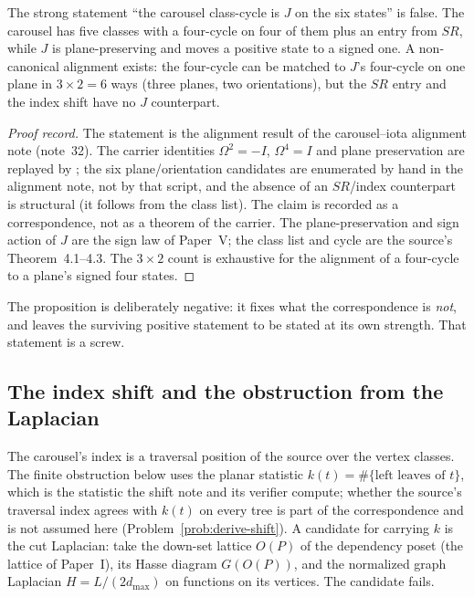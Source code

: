 \begin{proposition}\label{prop:screened-alignment}
The strong statement ``the carousel class-cycle is $J$ on the six states'' is false.
The carousel has five classes with a four-cycle on four of them plus an entry from
$SR$, while $J$ is plane-preserving and moves a positive state to a signed one.  A
non-canonical alignment exists: the four-cycle can be matched to $J$'s four-cycle on
one plane in $3\times 2=6$ ways (three planes, two orientations), but the $SR$ entry
and the index shift have no $J$ counterpart.
\end{proposition}

\begin{proof}[Proof record]
The statement is the alignment result of the carousel--iota alignment
note (note~32).  The carrier identities
$\Omega^{2}=-I$, $\Omega^{4}=I$ and plane preservation are replayed by
; the six plane/orientation candidates are
enumerated by hand in the alignment note, not by that script, and the absence of an
$SR$/index counterpart is structural (it follows from the class list).  The claim is
recorded as a correspondence, not as a theorem of the carrier.  The
plane-preservation and sign action of $J$ are the sign law of Paper~V; the class list
and cycle are the source's Theorem~4.1--4.3.  The $3\times2$ count is exhaustive for
the alignment of a four-cycle to a plane's signed four states.
\end{proof}

The proposition is deliberately negative: it fixes what the correspondence is
\emph{not}, and leaves the surviving positive statement to be stated at its own
strength.  That statement is a screw.

\subsection{The index shift and the obstruction from the Laplacian}

The carousel's index is a traversal position of the source over the vertex classes.
The finite obstruction below uses the planar statistic
$k(t)=\#\{\text{left leaves of }t\}$, which is the statistic the shift note and its
verifier compute; whether the source's traversal index agrees with $k(t)$ on every
tree is part of the correspondence and is not assumed here
(Problem~\ref{prob:derive-shift}).  A candidate for carrying $k$ is the cut Laplacian:
take the down-set lattice $O(P)$ of the dependency poset (the lattice of Paper~I),
its Hasse diagram $G(O(P))$, and the normalized graph Laplacian
$H=L/(2d_{\max})$ on functions on its vertices.  The candidate fails.

